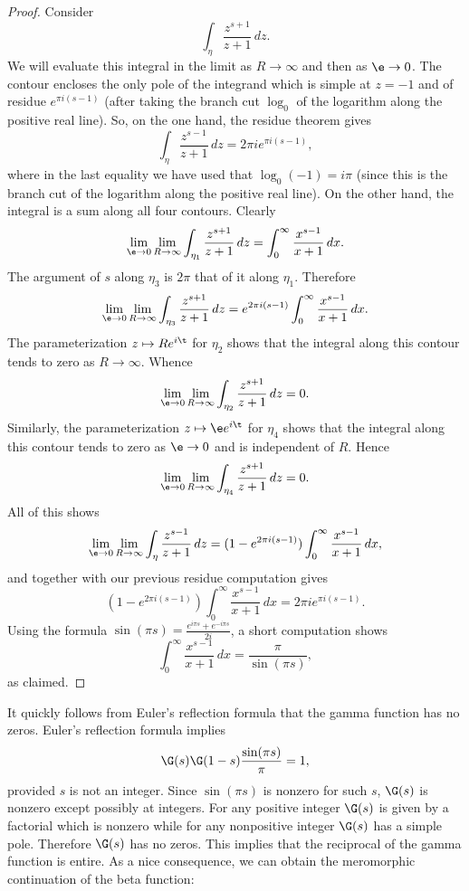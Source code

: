 \documentclass[12pt]{article}
\begin{document}
\begin{proof}
      Consider
      \[
        \int_{\eta}\frac{z^{s+1}}{z+1}\,dz.
      \]
      We will evaluate this integral in the limit as \(R \to \infty\) and then as \(\e \to 0\). The contour encloses the only pole of the integrand which is simple at \(z = -1\) and of residue \(e^{\pi i(s-1)}\) (after taking the branch cut \(\log_{0}\) of the logarithm along the positive real line). So, on the one hand, the residue theorem gives
      \[
        \int_{\eta}\frac{z^{s-1}}{z+1}\,dz = 2\pi ie^{\pi i(s-1)},
      \]
      where in the last equality we have used that \(\log_{0}(-1) = i\pi\) (since this is the branch cut of the logarithm along the positive real line). On the other hand, the integral is a sum along all four contours. Clearly
      \[
        \lim_{\e \to 0}\lim_{R \to \infty}\int_{\eta_{1}}\frac{z^{s+1}}{z+1}\,dz = \int_{0}^{\infty}\frac{x^{s-1}}{x+1}\,dx.
      \]
      The argument of \(s\) along \(\eta_{3}\) is \(2\pi\) that of it along \(\eta_{1}\). Therefore
      \[
        \lim_{\e \to 0}\lim_{R \to \infty}\int_{\eta_{3}}\frac{z^{s+1}}{z+1}\,dz = e^{2\pi i(s-1)}\int_{0}^{\infty}\frac{x^{s-1}}{x+1}\,dx.
      \]
      The parameterization \(z \mapsto Re^{i\t}\) for \(\eta_{2}\) shows that the integral along this contour tends to zero as \(R \to \infty\). Whence
      \[
        \lim_{\e \to 0}\lim_{R \to \infty}\int_{\eta_{2}}\frac{z^{s+1}}{z+1}\,dz = 0.
      \]
      Similarly, the parameterization \(z \mapsto \e e^{i\t}\) for \(\eta_{4}\) shows that the integral along this contour tends to zero as \(\e \to 0\) and is independent of \(R\). Hence 
      \[
        \lim_{\e \to 0}\lim_{R \to \infty}\int_{\eta_{4}}\frac{z^{s+1}}{z+1}\,dz = 0.
      \]
      All of this shows
      \[
        \lim_{\e \to 0}\lim_{R \to \infty} \int_{\eta}\frac{z^{s-1}}{z+1}\,dz = (1-e^{2\pi i(s-1)})\int_{0}^{\infty}\frac{x^{s-1}}{x+1}\,dx,
      \]
      and together with our previous residue computation gives
      \[
       (1-e^{2\pi i(s-1)})\int_{0}^{\infty}\frac{x^{s-1}}{x+1}\,dx = 2\pi ie^{\pi i(s-1)}.
      \]
      Using the formula \(\sin(\pi s) = \frac{e^{i\pi s}+e^{-i\pi s}}{2i}\), a short computation shows
      \[
        \int_{0}^{\infty}\frac{x^{s-1}}{x+1}\,dx = \frac{\pi}{\sin(\pi s)},
      \]
      as claimed.
    \end{proof}

    It quickly follows from Euler's reflection formula that the gamma function has no zeros. Euler's reflection formula implies
    \[
      \G(s)\G(1-s)\frac{\sin(\pi s)}{\pi} = 1,
    \]
    provided \(s\) is not an integer. Since \(\sin(\pi s)\) is nonzero for such \(s\), \(\G(s)\) is nonzero except possibly at integers. For any positive integer \(\G(s)\) is given by a factorial which is nonzero while for any nonpositive integer \(\G(s)\) has a simple pole. Therefore \(\G(s)\) has no zeros. This implies that the reciprocal of the gamma function is entire. As a nice consequence, we can obtain the meromorphic continuation of the beta function:
\end{document}
